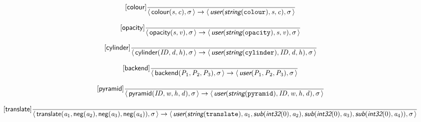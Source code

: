 \documentclass[10pt,leqno]{article}
\newcommand{\artVariable}[1]{\mbox{\em #1\/}}
\newcommand{\artConstructor}[1]{\mbox{\sf #1}}
\newcommand{\artCaseInsensitiveLiteral}[1]{\mbox{\tt #1}}
\newcommand{\artSpecial}[1]{\mbox{\sf\em #1}}
\begin{document}
\begin{equation}
\tag*{[\artConstructor{\sf colour}]}\frac{}{\langle\, \artConstructor{\sf colour}(\artVariable{s}, \artVariable{c}), \artVariable{$\sigma$}\,\rangle \rightarrow \langle\, \artSpecial{user}(\artSpecial{string}(\artCaseInsensitiveLiteral{colour}), \artVariable{s}, \artVariable{c}), \artVariable{$\sigma$}\,\rangle }
\end{equation}

\begin{equation}
\tag*{[\artConstructor{\sf opacity}]}\frac{}{\langle\, \artConstructor{\sf opacity}(\artVariable{s}, \artVariable{v}), \artVariable{$\sigma$}\,\rangle \rightarrow \langle\, \artSpecial{user}(\artSpecial{string}(\artCaseInsensitiveLiteral{opacity}), \artVariable{s}, \artVariable{v}), \artVariable{$\sigma$}\,\rangle }
\end{equation}

\begin{equation}
\tag*{[\artConstructor{\sf cylinder}]}\frac{}{\langle\, \artConstructor{\sf cylinder}(\artVariable{ID}, \artVariable{d}, \artVariable{h}), \artVariable{$\sigma$}\,\rangle \rightarrow \langle\, \artSpecial{user}(\artSpecial{string}(\artCaseInsensitiveLiteral{cylinder}), \artVariable{ID}, \artVariable{d}, \artVariable{h}), \artVariable{$\sigma$}\,\rangle }
\end{equation}

\begin{equation}
\tag*{[\artConstructor{\sf backend}]}\frac{}{\langle\, \artConstructor{\sf backend}(\artVariable{P$_{1}$}, \artVariable{P$_{2}$}, \artVariable{P$_{3}$}), \artVariable{$\sigma$}\,\rangle \rightarrow \langle\, \artSpecial{user}(\artVariable{P$_{1}$}, \artVariable{P$_{2}$}, \artVariable{P$_{3}$}), \artVariable{$\sigma$}\,\rangle }
\end{equation}

\begin{equation}
\tag*{[\artConstructor{\sf pyramid}]}\frac{}{\langle\, \artConstructor{\sf pyramid}(\artVariable{ID}, \artVariable{w}, \artVariable{h}, \artVariable{d}), \artVariable{$\sigma$}\,\rangle \rightarrow \langle\, \artSpecial{user}(\artSpecial{string}(\artCaseInsensitiveLiteral{pyramid}), \artVariable{ID}, \artVariable{w}, \artVariable{h}, \artVariable{d}), \artVariable{$\sigma$}\,\rangle }
\end{equation}

\begin{equation}
\tag*{[\artConstructor{\sf translate}]}\frac{}{\langle\, \artConstructor{\sf translate}(\artVariable{a$_{1}$}, \artConstructor{\sf neg}(\artVariable{a$_{2}$}), \artConstructor{\sf neg}(\artVariable{a$_{3}$}), \artConstructor{\sf neg}(\artVariable{a$_{4}$})), \artVariable{$\sigma$}\,\rangle \rightarrow \langle\, \artSpecial{user}(\artSpecial{string}(\artCaseInsensitiveLiteral{translate}), \artVariable{a$_{1}$}, \artSpecial{sub}(\artSpecial{int32}(0), \artVariable{a$_{2}$}), \artSpecial{sub}(\artSpecial{int32}(0), \artVariable{a$_{3}$}), \artSpecial{sub}(\artSpecial{int32}(0), \artVariable{a$_{4}$})), \artVariable{$\sigma$}\,\rangle }
\end{equation}
\end{document}
